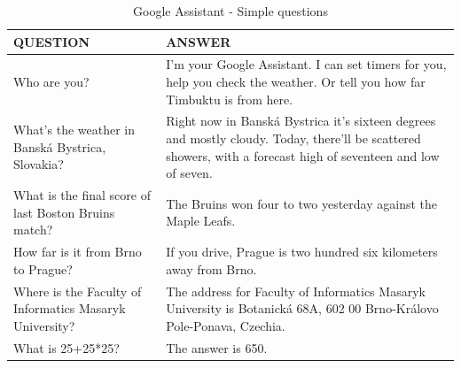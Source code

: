 \documentclass[
  digital, %
  oneside, %
  table,   %
  lof,     %
  lot,     %
]{fithesis3}
\begin{document}
\begin{table}[H]
    \begin{tabular}{ | p{6cm} | p{6cm} |}
    \hline
    QUESTION & ANSWER \\
    \hline
    Who are you? 
    & 
    I'm your Google Assistant. 
    \newline
    I can set timers for you, help you check the weather.
    \newline
    Or tell you how far Timbuktu is from here. 
    \\
    \hline
    What's the weather in Banská Bystrica, Slovakia?
    &
    Right now in Banská Bystrica it's sixteen degrees and mostly cloudy.
    \newline
    Today, there'll be scattered showers, with a forecast high of seventeen and low of seven.
    \\
    \hline
    What is the final score of last Boston Bruins match?
    &
    The Bruins won four to two yesterday against the Maple Leafs.
    \\
    \hline
    How far is it from Brno to Prague?
    &
    If you drive, Prague is two hundred six kilometers away from Brno.
    \\
    \hline
    Where is the Faculty of Informatics Masaryk University?
    &
    The address for Faculty of Informatics Masaryk University is Botanická 68A, 602 00 Brno-Královo Pole-Ponava, Czechia.
    \\
    \hline
    What is 25+25*25?
    & 
    The answer is 650.
    \\
    \hline
    \end{tabular}
    \caption{Google Assistant - Simple questions}
    \label{tab:google_simple_questions}
\end{table}
\end{document}
